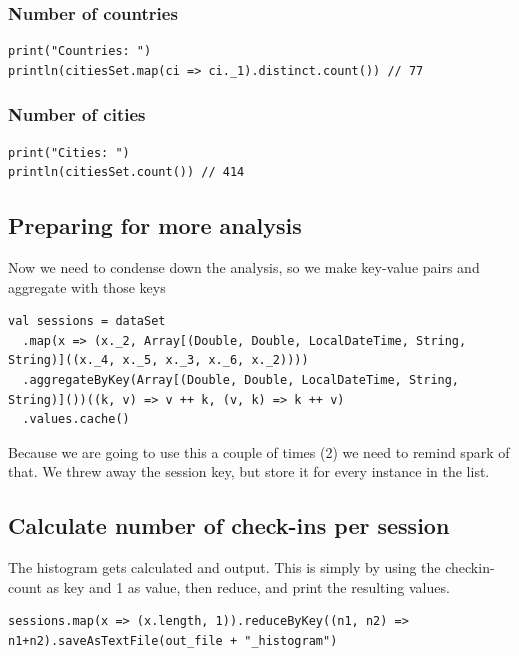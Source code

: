 \documentclass[abstract=on]{article}
\begin{document}
\subsubsection{Number of countries}
\begin{lstlisting}
print("Countries: ")
println(citiesSet.map(ci => ci._1).distinct.count()) // 77
\end{lstlisting}

\subsubsection{Number of cities}
\begin{lstlisting}
print("Cities: ")
println(citiesSet.count()) // 414
\end{lstlisting}



\subsection{Preparing for more analysis}
Now we need to condense down the analysis, so we make key-value pairs and aggregate with those keys
\begin{lstlisting}
val sessions = dataSet
  .map(x => (x._2, Array[(Double, Double, LocalDateTime, String, String)]((x._4, x._5, x._3, x._6, x._2))))
  .aggregateByKey(Array[(Double, Double, LocalDateTime, String, String)]())((k, v) => v ++ k, (v, k) => k ++ v)
  .values.cache()
\end{lstlisting}
Because we are going to use this a couple of times (2) we need to remind spark of that.
We threw away the session key, but store it for every instance in the list.


\subsection{Calculate number of check-ins per session}
The histogram gets calculated and output.
This is simply by using the checkin-count as key and 1 as value, then reduce, and print the resulting values.
\begin{lstlisting}
sessions.map(x => (x.length, 1)).reduceByKey((n1, n2) => n1+n2).saveAsTextFile(out_file + "_histogram")
\end{lstlisting}
\end{document}

